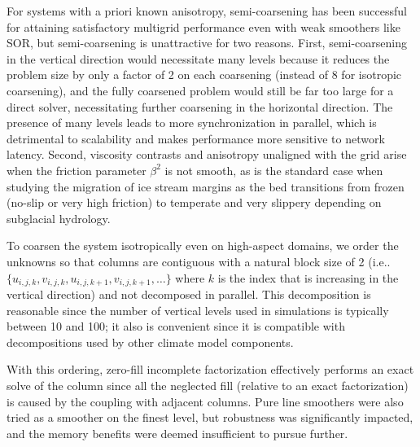 \documentclass[final]{siamltex}
\makeatletter
\DeclareRobustCommand\onedot{\futurelet\@let@token\@onedot}
\def\@onedot{\ifx\@let@token.\else.\null\fi\xspace}
\def\ie{{i.e}\onedot} \def\Ie{{I.e}\onedot}
\makeatother
\begin{document}
For systems with a priori known anisotropy, semi-coarsening has been successful for attaining
satisfactory multigrid performance even with weak smoothers like SOR, but semi-coarsening is
unattractive for two reasons.  First, semi-coarsening in the vertical direction would necessitate
many levels because it reduces the problem size by only a factor of 2 on each coarsening (instead of
8 for isotropic coarsening), and the fully coarsened problem would still be far too large for a
direct solver, necessitating further coarsening in the horizontal direction.  The presence of many
levels leads to more synchronization in parallel, which is detrimental to scalability and makes
performance more sensitive to network latency.  Second, viscosity contrasts and anisotropy
unaligned with the grid arise when the friction parameter $\beta^2$ is not smooth, as is the standard
case when studying the migration of ice stream margins as the bed transitions from frozen (no-slip
or very high friction) to temperate and very slippery depending on subglacial hydrology.

To coarsen the system isotropically even on high-aspect domains, we order the unknowns so that columns
are contiguous with a natural block size of 2
(\ie $\{u_{i,j,k},v_{i,j,k},u_{i,j,k+1},v_{i,j,k+1},\dotsc\}$ where $k$ is the index that is
increasing in the vertical direction) and not decomposed in parallel.  This decomposition is
reasonable since the number of vertical levels used in simulations is typically between 10 and 100;
it also is convenient since it is compatible with decompositions used by other climate model components.

With this ordering, zero-fill incomplete factorization effectively performs an exact solve of the
column since all the neglected fill (relative to an exact factorization) is caused by the coupling
with adjacent columns.  Pure line smoothers were also tried as a smoother on the finest level, but
robustness was significantly impacted, and the memory benefits were deemed insufficient to pursue
further.
\end{document}
